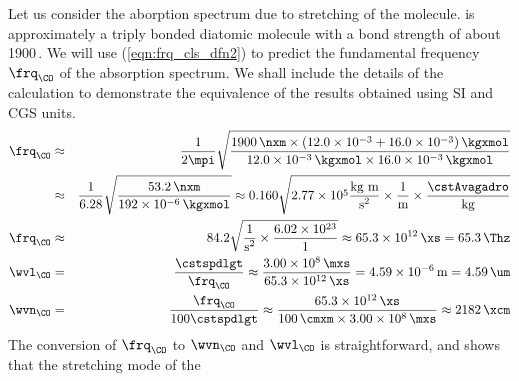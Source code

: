 \documentclass[12pt]{article}
\begin{document}
Let us consider the aborption spectrum due to stretching of
the  molecule.
\trmidx{\CO} is approximately a triply bonded diatomic molecule with 
a bond strength of about 1900\,\nxm.
We will use (\ref{eqn:frq_cls_dfn2}) to predict the fundamental
frequency $\frq_{\CO}$ of the absorption spectrum.
We shall include the details of the calculation to demonstrate
the equivalence of the results obtained using SI and CGS units.
\begin{eqnarray}
\frq_{\CO} & \approx & 
\frac{1}{2\mpi} 
\sqrt{ \frac{ 1900\,\mbox{\nxm} \times (12.0 \times 10^{-3} + 16.0
\times 10^{-3})\,\mbox{\kgxmol}}
{12.0 \times 10^{-3}\,\mbox{\kgxmol} \times 16.0 \times
10^{-3}\,\mbox{\kgxmol} } } \nonumber \\ 
& \approx & 
\frac{1}{6.28}
\sqrt{ \frac{ 53.2\,\mbox{\nxm} }
{192 \times 10^{-6}\,\mbox{\kgxmol} } } \nonumber 
\approx
0.160
\sqrt{ 2.77 \times 10^{5} \frac{\mbox{kg m}}{\mbox{s$^{2}$}} \times 
\frac{\mbox{1}}{\mbox{m}} \times \frac{\cstAvagadro}{\mbox{kg}} }
\nonumber \\
\frq_{\CO} & \approx &
84.2 \sqrt{ \frac{1}{\mbox{s$^{2}$}}
\times \frac{6.02 \times 10^{23}}{1} } \approx
65.3 \times 10^{12}\,\mbox{\xs} = 65.3\,\mbox{\Thz} \nonumber \\
\wvl_{\CO} & = & \frac{\cstspdlgt}{\frq_{\CO}} \approx 
\frac{3.00 \times 10^{8}\,\mbox{\mxs}}{65.3 \times 10^{12}\,\mbox{\xs}}
= 4.59 \times 10^{-6}\,\mbox{m} = 4.59\,\mbox{\um} \nonumber \\
\wvn_{\CO} & = & \frac{\frq_{\CO}}{100\cstspdlgt}
\approx \frac{65.3 \times 10^{12}\,\mbox{\xs}}{100\,\mbox{\cmxm} 
\times 3.00 \times 10^{8}\,\mbox{\mxs}}
\approx 2182\,\xcm
\label{eqn:wvn_CO_SI}
\end{eqnarray}
The conversion of $\frq_{\CO}$ to $\wvn_{\CO}$ and $\wvl_{\CO}$
is straightforward, and shows that the stretching mode of the \CO\
\end{document}
